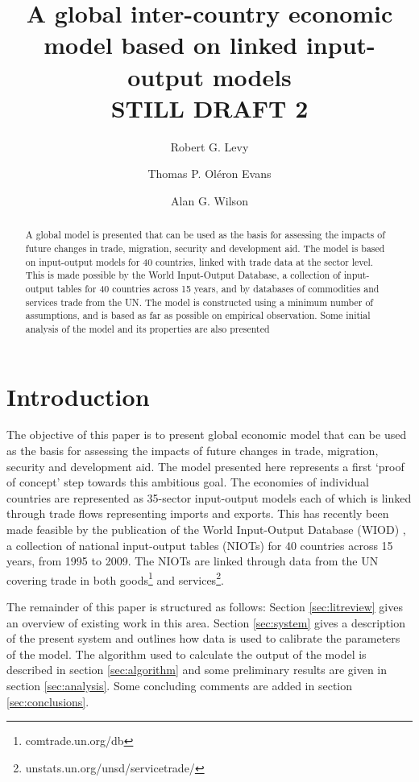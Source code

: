\documentclass[a4paper]{article}
\title{A global inter-country economic model based on linked input-output models \\ STILL DRAFT 2}
\author[*]{Robert G. Levy}
\author[**]{Thomas P. Ol\'{e}ron Evans}
\author[*]{Alan G. Wilson}
\affil[*]{Centre for Advanced Spatial Analysis, UCL Bartlett Faculty of the Built Environment,
90 Tottenham Court Road, London W1T 4TJ, UK}
\affil[**]{Department of Mathematics, University College London, Gower Street, London WC1E 6BT, UK}
\begin{document}
\maketitle

\begin{abstract}
A global model is presented that can be used as the basis for assessing the impacts of future changes in trade, migration, security and development aid.
The model is based on input-output models for 40 countries, linked with trade data at the sector level.
This is made possible by the World Input-Output Database, a collection of input-output tables for 40 countries across 15 years, and by databases of commodities and services trade from the UN.
The model is constructed using a minimum number of assumptions, and is based as far as possible on empirical observation.
Some initial analysis of the model and its properties are also presented
\end{abstract}

\section{Introduction}
The objective of this paper is to present global economic model that can be used as the basis for assessing the impacts of future changes in trade, migration, security and development aid.
The model presented here represents a first `proof of concept' step towards this ambitious goal.
The economies of individual countries are represented as 35-sector input-output models each of which is linked through trade flows representing imports and exports.
This has recently been made feasible by the publication of the World Input-Output Database (WIOD) \parencite{Timmer2012}, a collection of national input-output tables (NIOTs) for 40 countries across 15 years, from 1995 to 2009.
The NIOTs are linked through data from the UN covering trade in both goods\footnote{comtrade.un.org/db} and services\footnote{unstats.un.org/unsd/servicetrade/}.

The remainder of this paper is structured as follows: 
Section \ref{sec:litreview} gives an overview of existing work in this area.
Section \ref{sec:system} gives a description of the present system and outlines how data is used to calibrate the parameters of the model.
The algorithm used to calculate the output of the model is described in section \ref{sec:algorithm} and some preliminary results are given in section \ref{sec:analysis}.
Some concluding comments are added in section \ref{sec:conclusions}.
\end{document}
